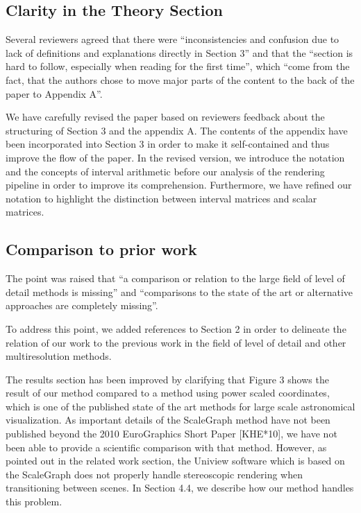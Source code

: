 \documentclass{article}
\begin{document}
\begin{tcolorbox}
\subsection{Clarity in the Theory Section}\label{concern:structure}
Several reviewers agreed that there were ``inconsistencies and confusion due to lack of definitions and explanations directly in Section 3'' and that the ``section is hard to follow, especially when reading for the first time'', which ``come from the fact, that the authors chose to move major parts of the content to the back of the paper to Appendix A''.
\end{tcolorbox}
We have carefully revised the paper based on reviewers feedback about the structuring of Section 3 and the appendix A.
The contents of the appendix have been incorporated into Section 3 in order to make it self-contained and thus improve the flow of the paper.
In the revised version, we introduce the notation and the concepts of interval arithmetic before our analysis of the rendering pipeline in order to improve its comprehension.
Furthermore, we have refined our notation to highlight the distinction between interval matrices and scalar matrices.

\vspace*{1cm}


\begin{tcolorbox}
\subsection{Comparison to prior work}\label{concern:comparisons}  The point was raised that ``a comparison or relation to the large field of level of detail methods is missing'' and ``comparisons to the state of the art or alternative approaches are completely missing''.
\end{tcolorbox}
To address this point, we added references to Section 2 in order to delineate the relation of our work to the previous work in the field of level of detail and other multiresolution methods.

The results section has been improved by clarifying that Figure 3 shows the result of our method compared to a method using power scaled coordinates, which is one of the published state of the art methods for large scale astronomical visualization.
As important details of the ScaleGraph method have not been published beyond the 2010 EuroGraphics Short Paper [KHE*10], we have not been able to provide a scientific comparison with that method.
However, as pointed out in the related work section, the Uniview software which is based on the ScaleGraph does not properly handle stereoscopic rendering when transitioning between scenes.
In Section 4.4, we describe how our method handles this problem.
\end{document}
